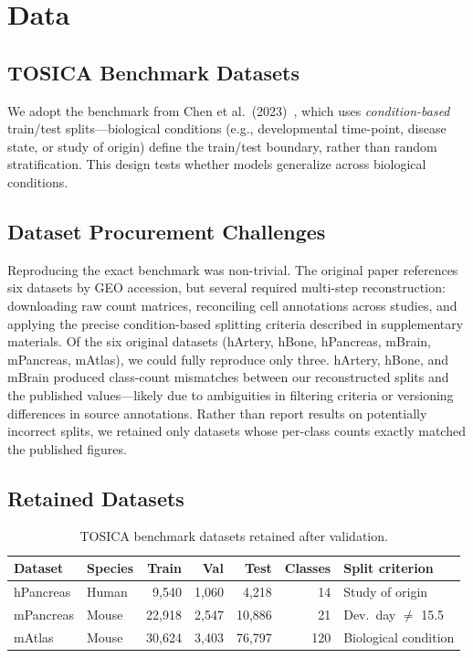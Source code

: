 \documentclass[11pt,letterpaper]{article}
\begin{document}
\section{Data}

\subsection{TOSICA Benchmark Datasets}
We adopt the benchmark from Chen et al.\ (2023)~\cite{chen2023tosica}, which
uses \emph{condition-based} train/test splits---biological conditions (e.g.,
developmental time-point, disease state, or study of origin) define the
train/test boundary, rather than random stratification. This design tests
whether models generalize across biological conditions.

\subsection{Dataset Procurement Challenges}
Reproducing the exact benchmark was non-trivial. The original paper references
six datasets by GEO accession, but several required multi-step reconstruction:
downloading raw count matrices, reconciling cell annotations across studies, and
applying the precise condition-based splitting criteria described in
supplementary materials. Of the six original datasets (hArtery, hBone, hPancreas,
mBrain, mPancreas, mAtlas), we could fully reproduce only three. hArtery, hBone,
and mBrain produced class-count mismatches between our reconstructed splits and
the published values---likely due to ambiguities in filtering criteria or
versioning differences in source annotations. Rather than report results on
potentially incorrect splits, we retained only datasets whose per-class counts
exactly matched the published figures.

\subsection{Retained Datasets}

\begin{table}[H]
\centering
\caption{TOSICA benchmark datasets retained after validation.}
\label{tab:datasets}
\begin{tabular}{@{}llrrrrl@{}}
\toprule
Dataset & Species & Train & Val & Test & Classes & Split criterion \\
\midrule
hPancreas & Human & 9,540 & 1,060 & 4,218 & 14 & Study of origin \\
mPancreas & Mouse & 22,918 & 2,547 & 10,886 & 21 & Dev.\ day $\neq$ 15.5 \\
mAtlas    & Mouse & 30,624 & 3,403 & 76,797 & 120 & Biological condition \\
\bottomrule
\end{tabular}
\end{table}
\end{document}
